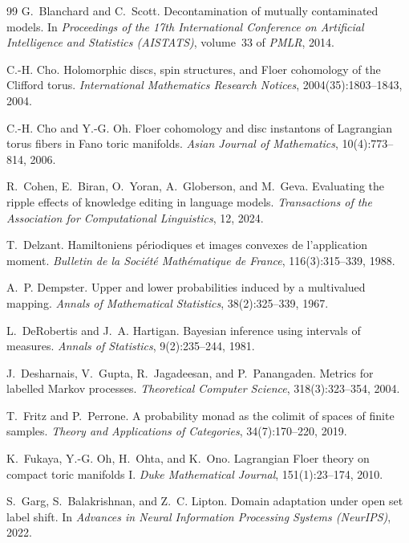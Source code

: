 \documentclass[11pt]{article}
\theoremstyle{definition}
\theoremstyle{remark}
\begin{document}
\begin{thebibliography}{99}
G.~Blanchard and C.~Scott.
\newblock Decontamination of mutually contaminated models.
\newblock In \emph{Proceedings of the 17th International Conference on Artificial Intelligence and
  Statistics (AISTATS)}, volume~33 of \emph{PMLR}, 2014.

C.-H. Cho.
\newblock Holomorphic discs, spin structures, and {F}loer cohomology of the {C}lifford torus.
\newblock \emph{International Mathematics Research Notices}, 2004(35):1803--1843, 2004.

C.-H. Cho and Y.-G. Oh.
\newblock Floer cohomology and disc instantons of {L}agrangian torus fibers in {F}ano toric manifolds.
\newblock \emph{Asian Journal of Mathematics}, 10(4):773--814, 2006.

R.~Cohen, E.~Biran, O.~Yoran, A.~Globerson, and M.~Geva.
\newblock Evaluating the ripple effects of knowledge editing in language models.
\newblock \emph{Transactions of the Association for Computational Linguistics}, 12, 2024.

T.~Delzant.
\newblock Hamiltoniens p\'eriodiques et images convexes de l'application moment.
\newblock \emph{Bulletin de la Soci\'et\'e Math\'ematique de France}, 116(3):315--339, 1988.

A.~P. Dempster.
\newblock Upper and lower probabilities induced by a multivalued mapping.
\newblock \emph{Annals of Mathematical Statistics}, 38(2):325--339, 1967.

L.~DeRobertis and J.~A. Hartigan.
\newblock Bayesian inference using intervals of measures.
\newblock \emph{Annals of Statistics}, 9(2):235--244, 1981.

J.~Desharnais, V.~Gupta, R.~Jagadeesan, and P.~Panangaden.
\newblock Metrics for labelled {M}arkov processes.
\newblock \emph{Theoretical Computer Science}, 318(3):323--354, 2004.

T.~Fritz and P.~Perrone.
\newblock A probability monad as the colimit of spaces of finite samples.
\newblock \emph{Theory and Applications of Categories}, 34(7):170--220, 2019.

K.~Fukaya, Y.-G. Oh, H.~Ohta, and K.~Ono.
\newblock Lagrangian {F}loer theory on compact toric manifolds {I}.
\newblock \emph{Duke Mathematical Journal}, 151(1):23--174, 2010.

S.~Garg, S.~Balakrishnan, and Z.~C. Lipton.
\newblock Domain adaptation under open set label shift.
\newblock In \emph{Advances in Neural Information Processing Systems (NeurIPS)}, 2022.


\end{thebibliography}
\end{document}
